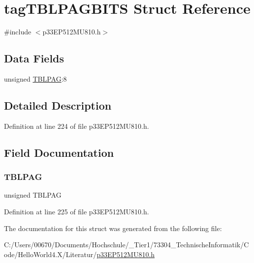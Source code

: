 \hypertarget{structtag_t_b_l_p_a_g_b_i_t_s}{}\section{tag\+T\+B\+L\+P\+A\+G\+B\+I\+TS Struct Reference}
\label{structtag_t_b_l_p_a_g_b_i_t_s}


{\ttfamily \#include $<$p33\+E\+P512\+M\+U810.\+h$>$}

\subsection*{Data Fields}
\begin{DoxyCompactItemize}
\item 
unsigned \hyperlink{structtag_t_b_l_p_a_g_b_i_t_s_a1d6a5ab1df407eb42a7e8453a04ec921}{T\+B\+L\+P\+AG}\+:8
\end{DoxyCompactItemize}


\subsection{Detailed Description}


Definition at line 224 of file p33\+E\+P512\+M\+U810.\+h.



\subsection{Field Documentation}
\mbox{\label{structtag_t_b_l_p_a_g_b_i_t_s_a1d6a5ab1df407eb42a7e8453a04ec921}} 
\subsubsection{\texorpdfstring{T\+B\+L\+P\+AG}{TBLPAG}}
{\footnotesize\ttfamily unsigned T\+B\+L\+P\+AG}



Definition at line 225 of file p33\+E\+P512\+M\+U810.\+h.



The documentation for this struct was generated from the following file\+:\begin{DoxyCompactItemize}
\item 
C\+:/\+Users/00670/\+Documents/\+Hochschule/\+\_\+\+Tier1/73304\+\_\+\+Technische\+Informatik/\+Code/\+Hello\+World4.\+X/\+Literatur/\hyperlink{p33_e_p512_m_u810_8h}{p33\+E\+P512\+M\+U810.\+h}\end{DoxyCompactItemize}
